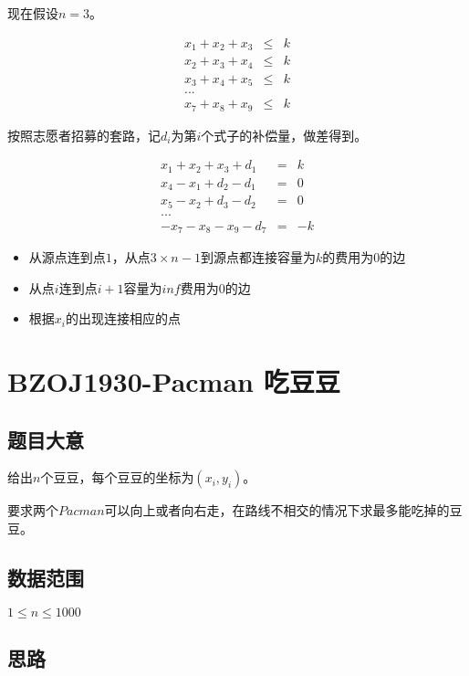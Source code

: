 \documentclass{ctexart}
\numberwithin{equation}{section}
\begin{document}
\begin{flushleft}
  现在假设$n=3$。
  
  \begin{eqnarray*} 
    x_1+x_2+x_3 &\le& k \\
    x_2+x_3+x_4 &\le& k \\
    x_3+x_4+x_5 &\le& k \\
    ...
    ~\\
    x_7+x_8+x_9 &\le& k
  \end{eqnarray*}

  按照志愿者招募的套路，记$d_i$为第$i$个式子的补偿量，做差得到。

  \begin{eqnarray*} 
    x_1+x_2+x_3+d_1 &=& k \\
    x_4-x_1+d_2-d_1 &=& 0 \\
    x_5-x_2+d_3-d_2 &=& 0 \\
    ...
    ~\\
    -x_7-x_8-x_9-d_7 &=& -k
  \end{eqnarray*}

  \begin{itemize}
  \item 从源点连到点$1$，从点$3\times n-1$到源点都连接容量为$k$的费用为$0$的边
  \item 从点$i$连到点$i+1$容量为$inf$费用为$0$的边
  \item 根据$x_i$的出现连接相应的点
  \end{itemize}
  
  \newpage

  \section{BZOJ1930-Pacman 吃豆豆}
  \subsection{题目大意}
  给出$n$个豆豆，每个豆豆的坐标为$(x_i,y_i)$。

  要求两个$Pacman$可以向上或者向右走，在路线不相交的情况下求最多能吃掉的豆豆。
  
    
  \subsection{数据范围}
  $1\le n \le 1000$
  \subsection{思路}


\end{flushleft}
\end{document}
